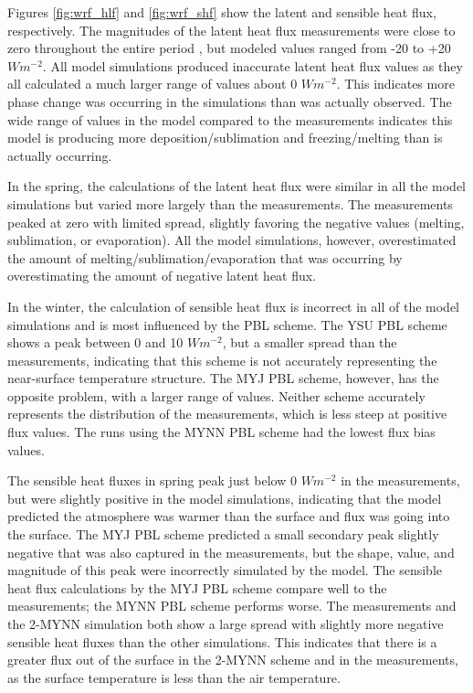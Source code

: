 Figures \ref{fig:wrf_hlf} and \ref{fig:wrf_shf} show the latent and sensible heat flux, respectively. The magnitudes of the latent heat flux measurements were close to zero throughout the entire period \citep{walden:2017}, but modeled values ranged from -20 to +20 $Wm^{-2}$. All model simulations produced inaccurate latent heat flux values as they all calculated a much larger range of values about 0 $Wm^{-2}$. This indicates more phase change was occurring in the simulations than was actually observed. The wide range of values in the model compared to the measurements indicates this model is producing more deposition/sublimation and freezing/melting than is actually occurring. 

In the spring, the calculations of the latent heat flux were similar in all the model simulations but varied more largely than the measurements. The measurements peaked at zero with limited spread, slightly favoring the negative values (melting, sublimation, or evaporation). All the model simulations, however, overestimated the amount of melting/sublimation/evaporation that was occurring by overestimating the amount of negative latent heat flux. 

In the winter, the calculation of sensible heat flux is incorrect in all of the model simulations and is most influenced by the PBL scheme. The YSU PBL scheme shows a peak between 0 and 10 $Wm^{-2}$, but a smaller spread than the measurements, indicating that this scheme is not accurately representing the near-surface temperature structure. The MYJ PBL scheme, however, has the opposite problem, with a larger range of values. Neither scheme accurately represents the distribution of the measurements, which is less steep at positive flux values. The runs using the MYNN PBL scheme had the lowest flux bias values.

The sensible heat fluxes in spring peak just below 0 $Wm^{-2}$ in the measurements, but were slightly positive in the model simulations, indicating that the model predicted the atmosphere was warmer than the surface and flux was going into the surface. The MYJ PBL scheme predicted a small secondary peak slightly negative that was also captured in the measurements, but the shape, value, and magnitude of this peak were incorrectly simulated by the model. The sensible heat flux calculations by the MYJ PBL scheme compare well to the measurements; the MYNN PBL scheme performs worse. The measurements and the 2-MYNN simulation both show a large spread with slightly more negative sensible heat fluxes than the other simulations. This indicates that there is a greater flux out of the surface in the 2-MYNN scheme and in the measurements, as the surface temperature is less than the air temperature.

